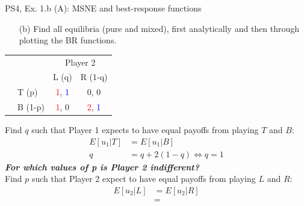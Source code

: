 \begin{frame}{PS4, Ex. 1.b (A): MSNE and best-response functions}
  \begin{multicols}{2}
    \begin{itemize}
      \item[(b)] Find all equilibria (pure and mixed), first analytically and then through plotting the BR functions.
    \end{itemize}
    \vspace{-8pt}
    \begin{table}
      \begin{tabular}{cl|c|c|}
        & \multicolumn{1}{c}{} & \multicolumn{2}{c}{\color{blue}Player 2}\\
        \parbox[t]{1mm}{}
        &  &  &  \\
        & T (p) & \textcolor{red}{1}, \textcolor{blue}{1} & 0, 0 \\
        & B (1-p) & \textcolor{red}{1}, 0 & \textcolor{red}{2}, \textcolor{blue}{1} \\
      \end{tabular}
    \end{table}
    Find $q$ such that Player 1 expects to have equal payoffs from playing $T$ and $B$:
    \begin{align*}
      E[u_1|T]&=E[u_1|B]\\
      q &= q + 2(1-q) \Leftrightarrow q = 1
    \end{align*}
    \textbf{\textit{For which values of p is Player 2 indifferent?}}\\\medskip
    Find $p$ such that Player 2 expect to have equal payoffs from playing $L$ and $R$:
    \begin{align*}
      E[u_2|L]&=E[u_2|R]\\
       &=
    \end{align*}
  \vfill\null \columnbreak
  \vfill\null
  \end{multicols}
\end{frame}
